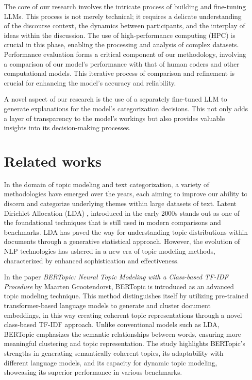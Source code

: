 \documentclass[fleqn,moreauthors,10pt]{ds_report}
\begin{document}
The core of our research involves the intricate process of building and fine-tuning LLMs. This process is not merely technical; it requires a delicate understanding of the discourse context, the dynamics between participants, and the interplay of ideas within the discussion. The use of high-performance computing (HPC) is crucial in this phase, enabling the processing and analysis of complex datasets. Performance evaluation forms a critical component of our methodology, involving a comparison of our model's performance with that of human coders and other computational models. This iterative process of comparison and refinement is crucial for enhancing the model's accuracy and reliability.

A novel aspect of our research is the use of a separately fine-tuned LLM to generate explanations for the model's categorization decisions. This not only adds a layer of transparency to the model's workings but also provides valuable insights into its decision-making processes.

\section*{Related works}

\iffalse
In the domain of topic modeling and text categorization, a variety of methodologies have emerged over the years, each aiming to improve our ability to discern and categorize underlying themes within large datasets of text. Latent Dirichlet Allocation (LDA) \cite{Blei2003LatentDA}, introduced in the early 2000s stands out as one of the foundational techniques that is still used in modern comparisons and benchmarks. LDA has paved the way for understanding topic distributions within documents through a generative statistical approach. However, the evolution of NLP technologies has ushered in a new era of topic modeling methods, characterized by enhanced sophistication and effectiveness. 

In the paper \textit{BERTopic: Neural Topic Modeling with a Class-based TF-IDF Procedure} by Maarten Grootendorst, BERTopic is introduced as an advanced topic modeling technique. This method distinguishes itself by utilizing pre-trained transformer-based language models to generate and cluster document embeddings, in this way creating coherent topic representations through a novel class-based TF-IDF approach. Unlike conventional models such as LDA, BERTopic emphasizes the semantic relationships between words, ensuring more meaningful clustering and topic representation. The study highlights BERTopic's strengths in generating semantically coherent topics, its adaptability with different language models, and its capacity for dynamic topic modeling, showcasing its superior performance in various benchmarks. 
\end{document}
